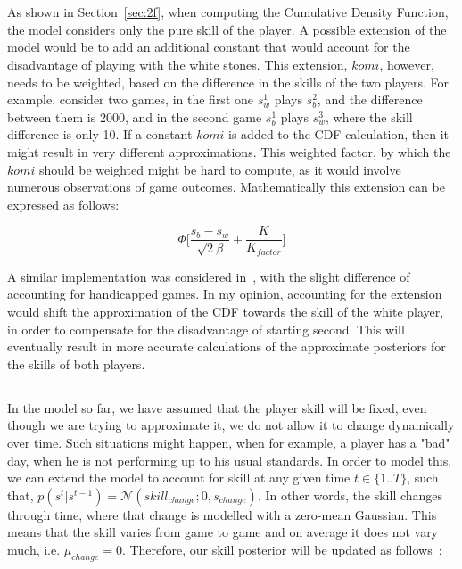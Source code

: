 \documentclass[a4paper,11pt]{article}
\theoremstyle{mytheor}
\begin{document}
\section{}

\subsection{}
As shown in Section~\ref{sec:2f}, when computing the Cumulative Density Function, the model considers only the pure skill of the player. A possible extension of the model would be to add an additional constant that would account for the disadvantage of playing with the white stones. This extension, $komi$, however, needs to be weighted, based on the difference in the skills of the two players. For example, consider two games, in the first one $s_w^1$ plays $s_b^2$, and the difference between them is 2000, and in the second game $s_b^1$ plays $s_w^3$, where the skill difference is only 10. If a constant $komi$ is added to the CDF calculation, then it might result in very different approximations. This weighted factor, by which the $komi$ should be weighted might be hard to compute, as it would involve numerous observations of game outcomes. Mathematically this extension can be expressed as follows:

\begin{equation}
    \Phi \Big[ \frac{s_b - s_w}{\sqrt{2}\beta} + \frac{K}{K_{factor}} \Big]
\end{equation}

A similar implementation was considered in~\cite{stanescu2011rating}, with the slight difference of accounting for handicapped games. In my opinion, accounting for the extension would shift the approximation of the CDF towards the skill of the white player, in order to compensate for the disadvantage of starting second. This will eventually result in more accurate calculations of the approximate posteriors for the skills of both players.

\subsection{}
In the model so far, we have assumed that the player skill will be fixed, even though we are trying to approximate it, we do not allow it to change dynamically over time. Such situations might happen, when for example, a player has a "bad" day, when he is not performing up to his usual standards. In order to model this, we can extend the model to account for skill at any given time $t \in \{1..T\}$, such that, $p(s^t|s^{t-1})=\mathcal{N}(skill_{change};0,s_{change})$. In other words, the skill changes through time, where that change is modelled with a zero-mean Gaussian. This means that the skill varies from game to game and on average it does not vary much, i.e. $\mu_{change}=0$. Therefore, our skill posterior will be updated as follows~\cite{bishop2013model}:
\end{document}
